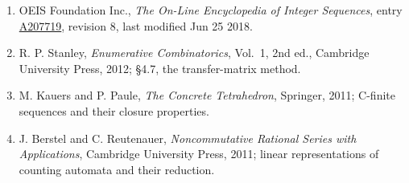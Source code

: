 \documentclass[11pt]{article}
\theoremstyle{definition}
\begin{document}
\begin{enumerate}

\item OEIS Foundation Inc., \emph{The On-Line Encyclopedia of Integer Sequences}, entry \href{https://oeis.org/A207719}{A207719}, revision 8, last modified Jun 25 2018.

\item R. P. Stanley, \emph{Enumerative Combinatorics}, Vol.~1, 2nd ed., Cambridge University Press, 2012; \S4.7, the transfer-matrix method.

\item M. Kauers and P. Paule, \emph{The Concrete Tetrahedron}, Springer, 2011; C-finite sequences and their closure properties.

\item J. Berstel and C. Reutenauer, \emph{Noncommutative Rational Series with Applications}, Cambridge University Press, 2011; linear representations of counting automata and their reduction.

\end{enumerate}
\end{document}
